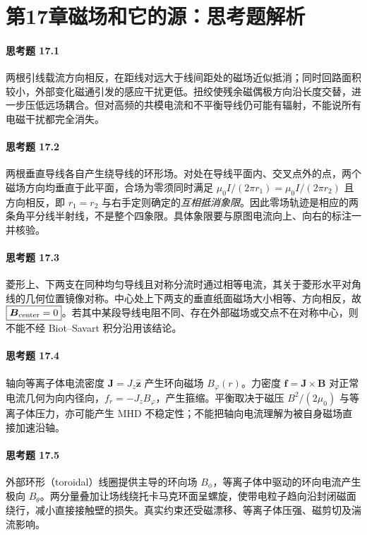 \section*{第17章\quad 磁场和它的源：思考题解析}
\paragraph{思考题 17.1}
两根引线载流方向相反，在距线对远大于线间距处的磁场近似抵消；同时回路面积较小，外部变化磁通引发的感应干扰更低。扭绞使残余磁偶极方向沿长度交替，进一步压低远场耦合。但对高频的共模电流和不平衡导线仍可能有辐射，不能说所有电磁干扰都完全消失。

\paragraph{思考题 17.2}
两根垂直导线各自产生绕导线的环形场。对处在导线平面内、交叉点外的点，两个磁场方向均垂直于此平面，合场为零须同时满足 \(\mu_0 I/(2\pi r_1)=\mu_0 I/(2\pi r_2)\) 且方向相反，即 \(\boxed{r_1=r_2}\) 与右手定则确定的\emph{互相抵消象限}。因此零场轨迹是相应的两条角平分线半射线，不是整个四象限。具体象限要与原图电流向上、向右的标注一并核验。

\paragraph{思考题 17.3}
菱形上、下两支在同种均匀导线且对称分流时通过相等电流，其关于菱形水平对角线的几何位置镜像对称。中心处上下两支的垂直纸面磁场大小相等、方向相反，故 \(\boxed{\boldsymbol B_{\rm center}=0}\)。若其中某段导线电阻不同、存在外部磁场或交点不在对称中心，则不能不经 Biot--Savart 积分沿用该结论。

\paragraph{思考题 17.4}
轴向等离子体电流密度 \(\boldsymbol J=J_z\hat{\boldsymbol z}\) 产生环向磁场 \(B_\varphi(r)\)。力密度 \(\boldsymbol f=\boldsymbol J\times\boldsymbol B\) 对正常电流几何为向内径向，\(\boxed{f_r=-J_z B_\varphi}\)，产生箍缩。平衡取决于磁压 \(B^2/(2\mu_0)\) 与等离子体压力，亦可能产生 MHD 不稳定性；不能把轴向电流理解为被自身磁场直接加速沿轴。

\paragraph{思考题 17.5}
外部环形（toroidal）线圈提供主导的环向场 \(B_\phi\)，等离子体中驱动的环向电流产生极向 \(B_\theta\)。两分量叠加让场线绕托卡马克环面呈螺旋，使带电粒子趋向沿封闭磁面绕行，减小直接接触壁的损失。真实约束还受磁漂移、等离子体压强、磁剪切及湍流影响。

